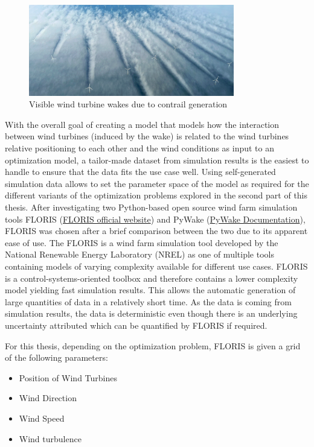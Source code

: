 \begin{figure}[h] 
	\centering
	\includegraphics[width=0.8\textwidth]{figures/introduction/wake_photo.png} 
	\caption{Visible wind turbine wakes due to contrail generation \cite{windpowermonthly_offshore_clusters}}
	\label{fig:wake_photo}
\end{figure}


With the overall goal of creating a model that models how the interaction between wind turbines (induced by the wake) is related to the wind turbines relative positioning to each other and the wind conditions as input to an optimization model, a tailor-made dataset from simulation results is the easiest to handle to ensure that the data fits the use case well. Using self-generated simulation data allows to set the parameter space of the model as required for the different variants of the optimization problems explored in the second part of this thesis. After investigating two Python-based open source wind farm simulation tools FLORIS (\href{https://www.nrel.gov/wind/floris}{FLORIS official website}) and PyWake (\href{https://topfarm.pages.windenergy.dtu.dk/PyWake/}{PyWake Documentation}), FLORIS was chosen after a brief comparison between the two due to its apparent ease of use. The FLORIS is a wind farm simulation tool developed by the National Renewable Energy Laboratory (NREL) as one of multiple tools containing models of varying complexity available for different use cases. FLORIS is a control-systems-oriented toolbox and therefore contains a lower complexity model yielding fast simulation results. This allows the automatic generation of large quantities of data in a relatively short time. As the data is coming from  simulation results, the data is deterministic even though there is an underlying uncertainty attributed which can be quantified by FLORIS if required. 

For this thesis, depending on the optimization problem, FLORIS is given a grid of the following parameters:

\begin{itemize}
	\item Position of Wind Turbines
	\item Wind Direction
	\item Wind Speed
	\item Wind turbulence
\end{itemize}


